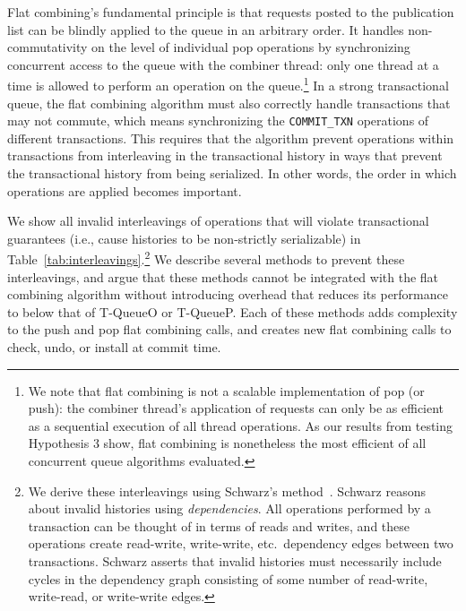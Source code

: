 Flat combining's fundamental principle is that requests posted to the publication list can be blindly applied to the queue in an arbitrary order. It handles non-commutativity on the level of individual pop operations by synchronizing concurrent access to the queue with the combiner thread: only one thread at a time is allowed to perform an operation on the queue.\footnote{We note that flat combining is not a scalable implementation of pop (or push): the combiner thread's application of requests can only be as efficient as a sequential execution of all thread operations. As our results from testing Hypothesis 3 show, flat combining is nonetheless the most efficient of all concurrent queue algorithms evaluated.}
In a strong transactional queue, the flat combining algorithm must also correctly handle transactions that may not commute, which means synchronizing the \texttt{COMMIT\_TXN} operations of different transactions. This requires that the algorithm prevent operations within transactions from interleaving in the transactional history in ways that prevent the transactional history from being serialized. In other words, the order in which operations are applied becomes important.

We show all invalid interleavings of operations that will violate transactional guarantees (i.e., cause histories to be non-strictly serializable) in Table~\ref{tab:interleavings}.\footnote{We derive these interleavings using Schwarz's method~\cite{schwarz}. Schwarz reasons about invalid histories using \emph{dependencies}. All operations performed by a transaction can be thought of in terms of reads and writes, and these operations create read-write, write-write, etc.\ dependency edges between two transactions. Schwarz asserts that invalid histories must necessarily include cycles in the dependency graph consisting of some number of read-write, write-read, or write-write edges.}
We describe several methods to prevent these interleavings, and argue that these methods cannot be integrated with the flat combining algorithm without introducing overhead that reduces its performance to below that of T-QueueO or T-QueueP. 
Each of these methods adds complexity to the push and pop flat combining calls, and creates new flat combining calls to check, undo, or install at commit time.

